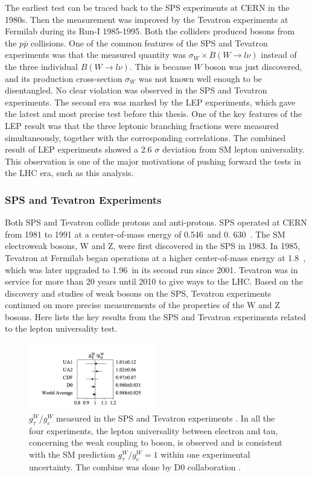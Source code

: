 \noindent The earliest test can be traced back to the SPS experiments at CERN in the 1980s. Then the measurement was improved by the Tevatron experiments at Fermilab during its Run-I 1985-1995. Both the colliders produced \PW bosons from the $p\bar{p}$ collisions. One of the common features of the SPS and Tevatron experiments was that the measured quantity was $\sigma_W \times B(W\to l\nu)$ instead of the three individual $B(W\to l\nu)$. This is because $W$ boson was just discovered, and its production cross-section $\sigma_W$ was not known well enough to be disentangled. No clear violation was observed in the SPS and Tevatron experiments. The second era was marked by the LEP experiments, which gave the latest and most precise test before this thesis. One of the key features of the LEP result was that the three leptonic branching fractions were measured simultaneously, together with the corresponding correlations. The combined result of LEP experiments showed a 2.6 $\sigma$ deviation from SM lepton universality. This observation is one of the major motivations of pushing forward the tests in the LHC era, such as this analysis.


\subsubsection{SPS and Tevatron Experiments}

Both SPS and Tevatron collide protons and anti-protons. SPS operated at CERN from 1981 to 1991 at a center-of-mass energy of 0.546~\TeV and 0. 630~\TeV. The SM electroweak bosons, W and Z, were first discovered in the SPS in 1983. In 1985, Tevatron at Fermilab began operations at a higher center-of-mass energy at 1.8~\TeV, which was later upgraded to 1.96~\TeV in its second run since 2001. Tevatron was in service for more than 20 years until 2010 to give ways to the LHC. Based on the discovery and studies of weak bosons on the SPS, Tevatron experiments continued on more precise measurements of the properties of the W and Z bosons. Here lists the key results from the SPS and Tevatron experiments related to the lepton universality test.


\begin{figure}[ht]
    \centering
    \includegraphics[width=0.5\textwidth]{chapters/RelatedWorks/sectionLU/figures/spsTevatron.png}
    \caption{ $g^W_\tau / g^W_e$ measured in the SPS and Tevatron experiments \cite{Abbott:1999pk}. In all the four experiments, the lepton universality between electron and tau, concerning the weak coupling to \PW boson, is observed and is consistent with the SM prediction $g^W_\tau / g^W_e=1$ within one experimental uncertainty. The combine was done by D0 collaboration \cite{Abbott:1999pk}.}
    \label{fig:relatedWorks:lu:W:spsTevatronCombinedRatio}
\end{figure}

